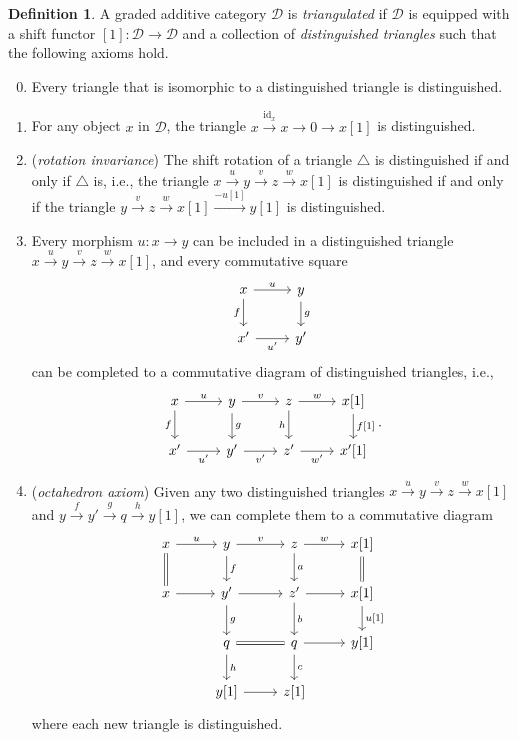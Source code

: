 \documentclass[10pt,letterpaper,cm]{nupset}
\theoremstyle{definition}
\newtheorem{definition}{Definition}[subsection]
\theoremstyle{theorem}
\theoremstyle{remark}
\newcommand{\1}{\mathbf{1}}
\renewcommand{\d}{\mathscr{D}}
\newcommand{\0}{\vec 0}
\DeclareMathOperator{\id}{id}
\begin{document}
\begin{definition}
A graded additive category $\d$ is \textit{triangulated} if $\d$ is equipped with a shift functor $[1] : \d \to \d$ and a collection of \textit{distinguished triangles} such that the following axioms hold.
\begin{enumerate}
\setcounter{enumi}{-1}
\item Every triangle that is isomorphic to a distinguished triangle is distinguished. 
\item For any object $x$ in $\d$, the triangle $x \overset{\id_x}{\longrightarrow} x \to 0 \to x[1]$ is distinguished.
\item (\textit{rotation invariance}) The shift rotation of a triangle $\triangle$ is distinguished if and only if $\triangle$ is, i.e., the triangle $x\overset{u}{\longrightarrow} y\overset{v}{\longrightarrow}z \overset{w}{\longrightarrow}  x[1]$ is distinguished if and only if the triangle $ y\overset{v}{\longrightarrow}z \overset{w}{\longrightarrow}  x[1] \overset{{-}u[1]}{\longrightarrow} y[1]$  is distinguished. 
\item Every morphism $u : x \to y$ can be included in a distinguished triangle $x\overset{u}{\longrightarrow} y\overset{v}{\longrightarrow}z \overset{w}{\longrightarrow}  x[1]$, and every commutative square 
\[
\begin{tikzcd}
x \arrow[r, "u"] \arrow[d, "f"'] & y \arrow[d, "g"] \\
x' \arrow[r, "u'"']              & y'              
\end{tikzcd}
\]
can be completed to a commutative diagram of distinguished triangles, i.e., 
\[
\begin{tikzcd}
x \arrow[r, "u"] \arrow[d, "f"'] & y \arrow[r, "v"] \arrow[d, "g"] & z \arrow[r, "w"] \arrow[d, "h"'] & {x[1]} \arrow[d, "{f[1]}"] \\
x' \arrow[r, "u'"']              & y' \arrow[r, "v'"']             & z' \arrow[r, "w'"']              & {x'[1]}                   
\end{tikzcd}
.\]
\item (\textit{octahedron axiom}) Given any two distinguished triangles $x\overset{u}{\longrightarrow} y\overset{v}{\longrightarrow}z \overset{w}{\longrightarrow} x[1]$ and $y\overset{f}{\longrightarrow} y'\overset{g}{\longrightarrow}q \overset{h}{\longrightarrow}  y[1]$, we can complete them to a commutative diagram
\[
\begin{tikzcd}
x \arrow[d, equals] \arrow[r, "u"] & y \arrow[d, "f"] \arrow[r, "v"] & z \arrow[d, "a"] \arrow[r, "w"] & {x[1]} \arrow[d, equals]           \\
x \arrow[r]                & y' \arrow[d, "g"] \arrow[r]     & z' \arrow[d, "b"] \arrow[r]     & {x[1]} \arrow[d, "{u[1]}"] \\
                           & q \arrow[r, equals] \arrow[d, "h"]      & q \arrow[r] \arrow[d, "c"]      & {y[1]} \\
                           & {y[1]} \arrow[r]                & {z[1]}               &                     
\end{tikzcd}
\]
where each new triangle is distinguished. 
\end{enumerate}
\end{definition}
\end{document}
